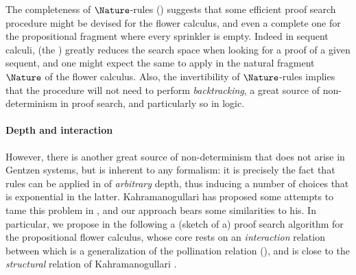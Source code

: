 \begin{scope}
The completeness of $\Nature$-rules () suggests
that some efficient proof search procedure might be devised for the flower
calculus, and even a complete one for the propositional fragment where every
sprinkler is empty. Indeed in sequent calculi, 
(the ) greatly reduces the search space when looking for a
proof of a given sequent, and one might expect the same to apply in the natural
fragment $\Nature$ of the flower calculus. Also, the invertibility of
$\Nature$-rules implies that the procedure will not need to perform
\emph{backtracking}, a great source of non-determinism in proof
search, and particularly so in  logic.

\paragraph{Depth and interaction}

However, there is another great source of non-determinism that does not arise in
Gentzen systems, but is inherent to any  formalism: it is
precisely the fact that rules can be applied in  of \emph{arbitrary}
depth, thus inducing a number of choices that is exponential in the latter.
Kahramanogullari has proposed some attempts to tame this problem in
, and our approach bears some
similarities to his. In particular, we propose in the following a (sketch of a)
proof search algorithm for the propositional flower calculus, whose core rests
on an \emph{interaction} relation between  which is a generalization of
the pollination relation (), and is close to the
\emph{structural} relation of Kahramanogullari
\cite[Definition~2.13]{lmcs:1089}.


\end{scope}
